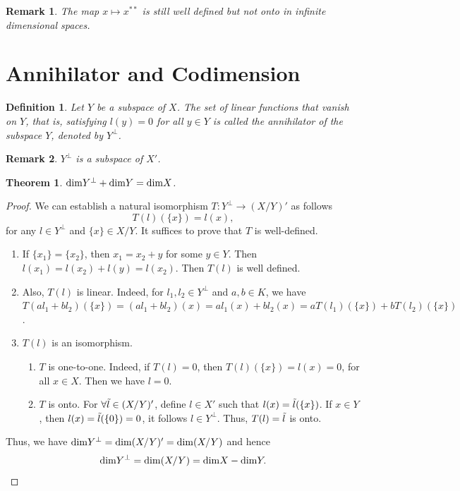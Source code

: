 \documentclass[10pt]{book}
\newtheorem{definition}{Definition}[chapter]
\newtheorem{theorem}{Theorem}[chapter]
\newtheorem{remark}{Remark}[chapter]
\theoremstyle{definition}
\numberwithin{equation}{chapter}
\begin{document}
\begin{remark}
The map $x \mapsto x^{**}$ is still well defined but not onto in infinite dimensional spaces.
\end{remark}

\medskip

\section{Annihilator and Codimension}
\begin{definition}
Let $Y$ be a subspace of $X$. The set of linear functions that vanish on $Y$, that is, satisfying $l(y) = 0$ for all $y\in Y$ is called the annihilator of the subspace $Y$, denoted by $Y^\bot$.
\end{definition}
\begin{remark}
$Y^\bot$ is a subspace of $X'$.
\end{remark}

\medskip

\begin{theorem}
${\rm dim}Y^\bot + {\rm dim}Y = {\rm dim}X$.
\end{theorem}
\begin{proof}
We can establish a natural isomorphism $T:Y^\bot\to (X/Y)'$ as follows $$T(l)(\{x\}) = l(x),$$
for any $l\in Y^\bot$ and $\{x\}\in X/Y$. It suffices to prove that $T$ is well-defined.
\begin{enumerate}[label=(\alph*)]
    \item If $\{x_1\} = \{x_2\}$, then $x_1 = x_2 + y$ for some $y\in Y$. Then $l(x_1) = l(x_2) + l(y) = l(x_2)$. Then $T(l)$ is well defined.
    \item Also, $T(l)$ is linear. Indeed, for $l_1, l_2\in Y^\bot$ and $a,b \in K$, we have $T(al_1 + bl_2)(\{x\}) = (al_1 + bl_2)(x) = a l_1(x) + bl_2(x) = a T(l_1)(\{x\}) + b T(l_2)(\{x\})$.
    \item $T(l)$ is an isomorphism. 
    \begin{enumerate}[label=\arabic*)]
        \item $T$ is one-to-one. Indeed, if $T(l) = 0$, then $T(l)(\{x\}) = l(x) = 0$, for all $x\in X$. Then we have $l = 0$.
        \item $T$ is onto. For $\forall \Tilde{l}\in (X/Y)'$, define $l\in X'$ such that $l(x) = \Tilde{l}(\{x\})$. If $x\in Y$, then $l(x) = \Tilde{l}(\{0\}) = 0$, it follows $l\in Y^\bot$. Thus, $T(l) = \Tilde{l}$ is onto.
    \end{enumerate}
\end{enumerate}

Thus, we have ${\rm dim}Y^\bot = {\rm dim}(X/Y)' = {\rm dim}(X/Y)$ and hence 
\begin{align*}
    {\rm dim}Y^\bot = {\rm dim}(X/Y) = {\rm dim}X - {\rm dim}Y.
\end{align*}
\end{proof}
\end{document}

